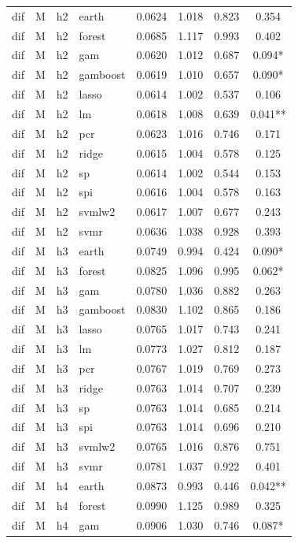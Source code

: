 \begin{ThreePartTable}
\begin{longtable}[t]{llclcccc}
\addlinespace
dif & M & h2 & earth & 0.0624 & 1.018 & 0.823 & 0.354\\
dif & M & h2 & forest & 0.0685 & 1.117 & 0.993 & 0.402\\
dif & M & h2 & gam & 0.0620 & 1.012 & 0.687 & 0.094*\\
dif & M & h2 & gamboost & 0.0619 & 1.010 & 0.657 & 0.090*\\
dif & M & h2 & lasso & 0.0614 & 1.002 & 0.537 & 0.106\\
dif & M & h2 & lm & 0.0618 & 1.008 & 0.639 & 0.041**\\
dif & M & h2 & pcr & 0.0623 & 1.016 & 0.746 & 0.171\\
dif & M & h2 & ridge & 0.0615 & 1.004 & 0.578 & 0.125\\
dif & M & h2 & sp & 0.0614 & 1.002 & 0.544 & 0.153\\
dif & M & h2 & spi & 0.0616 & 1.004 & 0.578 & 0.163\\
dif & M & h2 & svmlw2 & 0.0617 & 1.007 & 0.677 & 0.243\\
dif & M & h2 & svmr & 0.0636 & 1.038 & 0.928 & 0.393\\
\addlinespace
dif & M & h3 & earth & 0.0749 & 0.994 & 0.424 & 0.090*\\
dif & M & h3 & forest & 0.0825 & 1.096 & 0.995 & 0.062*\\
dif & M & h3 & gam & 0.0780 & 1.036 & 0.882 & 0.263\\
dif & M & h3 & gamboost & 0.0830 & 1.102 & 0.865 & 0.186\\
dif & M & h3 & lasso & 0.0765 & 1.017 & 0.743 & 0.241\\
dif & M & h3 & lm & 0.0773 & 1.027 & 0.812 & 0.187\\
dif & M & h3 & pcr & 0.0767 & 1.019 & 0.769 & 0.273\\
dif & M & h3 & ridge & 0.0763 & 1.014 & 0.707 & 0.239\\
dif & M & h3 & sp & 0.0763 & 1.014 & 0.685 & 0.214\\
dif & M & h3 & spi & 0.0763 & 1.014 & 0.696 & 0.210\\
dif & M & h3 & svmlw2 & 0.0765 & 1.016 & 0.876 & 0.751\\
dif & M & h3 & svmr & 0.0781 & 1.037 & 0.922 & 0.401\\
\addlinespace
dif & M & h4 & earth & 0.0873 & 0.993 & 0.446 & 0.042**\\
dif & M & h4 & forest & 0.0990 & 1.125 & 0.989 & 0.325\\
dif & M & h4 & gam & 0.0906 & 1.030 & 0.746 & 0.087*\\

\end{longtable}
\end{ThreePartTable}
